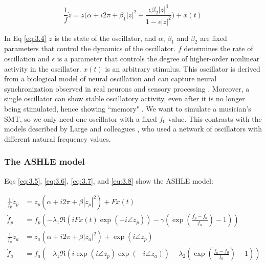 \documentclass{report}
\begin{document}
\begin{equation}
\frac{1}{f}\dot{z} = z\bigg(\alpha + i2\pi + \beta_1|z|^2 + \frac{\epsilon\beta_2|z|^4}{1-\epsilon|z|^2}\bigg) + x(t) \label{eq:3.4}
\end{equation}

In Eq \eqref{eq:3.4} $z$ is the state of the oscillator, and $\alpha$, $\beta_1$ and $\beta_2$ are fixed parameters that control the dynamics of the oscillator. $f$ determines the rate of oscillation and $\epsilon$ is a parameter that controls the degree of higher-order nonlinear activity in the oscillator. $x(t)$ is an arbitrary stimulus. This oscillator is derived from a biological model of neural oscillation and can capture neural synchronization observed in real neurons and sensory processing \cite{lerud2019canonical, tal2017neural}. Moreover, a single oscillator can show stable oscillatory activity, even after it is no longer being stimulated, hence showing ``memory" \cite{kim2015signal}. We want to simulate a musician's SMT, so we only need one oscillator with a fixed $f_0$ value. This contrasts with the models described by Large and colleagues \cite{large2010canonical}, who used a network of oscillators with different natural frequency values.

\subsubsection{The ASHLE model}

Eqs \eqref{eq:3.5}, \eqref{eq:3.6}, \eqref{eq:3.7}, and \eqref{eq:3.8} show the ASHLE model:

\begin{subequations}
\begin{align}
\frac{1}{f_p}\dot{z}_p &= z_p\left( \alpha + i2\pi + \beta|z_p|^2 \right) + Fx(t) \label{eq:3.5} \\
\dot{f}_p &= f_p \left(-\lambda_1\Re\left( iFx(t)\exp(-i\angle z_p) \right) - \gamma\left( \exp\left(\frac{f_p-f_a}{f_a}\right)-1 \right) \right) \label{eq:3.6} \\
\frac{1}{f_a}\dot{z}_a &= z_a \left( \alpha + i2\pi + \beta|z_a|^2 \right) + \exp(i \angle z_p) \label{eq:3.7} \\
\dot{f}_a &= f_a \left( -\lambda_1\Re \left( i\exp(i \angle z_p)\exp(-i\angle z_a) \right) - \lambda_2 \left( \exp\left(\frac{f_a-f_0}{f_0}\right)-1 \right) \right) \label{eq:3.8}
\end{align}
\end{subequations}
\end{document}
